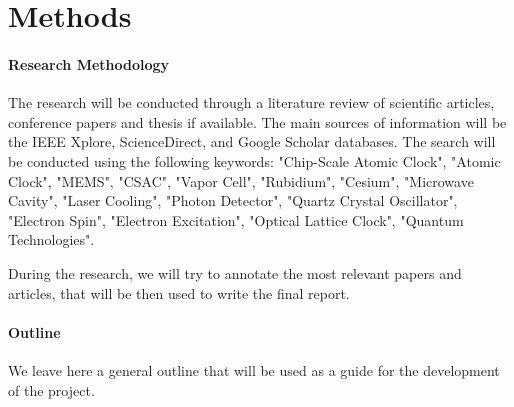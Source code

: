 \section{Methods}
\label{sec:methods}

\paragraph{Research Methodology}
The research will be conducted through a literature review of scientific articles, conference papers and thesis if available.
The main sources of information will be the IEEE Xplore, ScienceDirect, and Google Scholar databases.
The search will be conducted using the following keywords: "Chip-Scale Atomic Clock", "Atomic Clock", "MEMS", "CSAC", "Vapor Cell", "Rubidium", "Cesium", "Microwave Cavity", "Laser Cooling", "Photon Detector", "Quartz Crystal Oscillator", "Electron Spin", "Electron Excitation", "Optical Lattice Clock", "Quantum Technologies".

During the research, we will try to annotate the most relevant papers and articles, that will be then used to write the final report.

\paragraph{Outline}
We leave here a general outline that will be used as a guide for the development of the project.

